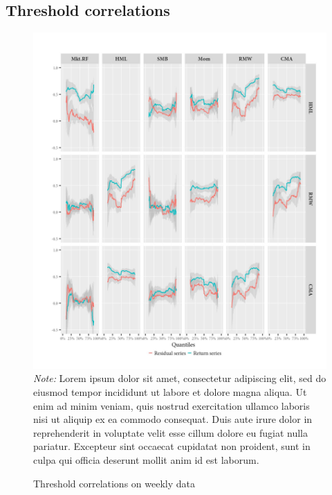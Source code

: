 \subsection{Threshold correlations}
\begin{figure}[H]
  \caption{Threshold correlations on weekly data}
  \label{diag:thresholdweekly}
  \centering
  \begin{minipage}{\textwidth}
  \includegraphics[scale=1]{graphics/thresholdweekly.jpeg}  
  \footnotesize
  \textit{Note:} Lorem ipsum dolor sit amet, consectetur adipiscing elit, sed do eiusmod tempor incididunt ut labore et dolore magna aliqua. Ut enim ad minim veniam, quis nostrud exercitation ullamco laboris nisi ut aliquip ex ea commodo consequat. Duis aute irure dolor in reprehenderit in voluptate velit esse cillum dolore eu fugiat nulla pariatur. Excepteur sint occaecat cupidatat non proident, sunt in culpa qui officia deserunt mollit anim id est laborum.
  \end{minipage}
\end{figure}
